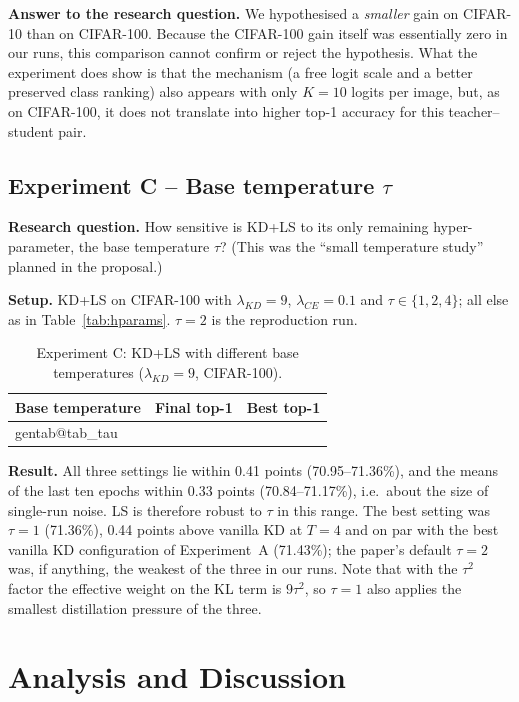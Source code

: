\documentclass[12pt,a4paper]{article}
\makeatletter
\newcommand{\gentable}[2]{\csname gentab@#1\endcsname}
\makeatother
\begin{document}
\textbf{Answer to the research question.} We hypothesised a \emph{smaller} gain on CIFAR-10 than on CIFAR-100. Because the CIFAR-100 gain itself was essentially zero in our runs, this comparison cannot confirm or reject the hypothesis. What the experiment does show is that the mechanism (a free logit scale and a better preserved class ranking) also appears with only $K=10$ logits per image, but, as on CIFAR-100, it does not translate into higher top-1 accuracy for this teacher--student pair.

\subsection{Experiment C -- Base temperature $\tau$}
\textbf{Research question.} How sensitive is KD+LS to its only remaining hyper-parameter, the base temperature $\tau$? (This was the ``small temperature study'' planned in the proposal.)

\textbf{Setup.} KD+LS on CIFAR-100 with $\lambda_{KD}=9$, $\lambda_{CE}=0.1$ and $\tau\in\{1,2,4\}$; all else as in Table~\ref{tab:hparams}. $\tau=2$ is the reproduction run.

\begin{table}[H]
\centering
\caption{Experiment C: KD+LS with different base temperatures ($\lambda_{KD}=9$, CIFAR-100).}
\label{tab:tau}
\begin{tabular}{lcc}
\toprule
Base temperature & Final top-1 & Best top-1 \\
\midrule
\gentable{tab_tau}{3}
\bottomrule
\end{tabular}
\end{table}

\textbf{Result.} All three settings lie within 0.41 points (70.95--71.36\%), and the means of the last ten epochs within 0.33 points (70.84--71.17\%), i.e.\ about the size of single-run noise. LS is therefore robust to $\tau$ in this range. The best setting was $\tau=1$ (71.36\%), 0.44 points above vanilla KD at $T=4$ and on par with the best vanilla KD configuration of Experiment~A (71.43\%); the paper's default $\tau=2$ was, if anything, the weakest of the three in our runs. Note that with the $\tau^2$ factor the effective weight on the KL term is $9\tau^2$, so $\tau=1$ also applies the smallest distillation pressure of the three.

\section{Analysis and Discussion}
\end{document}
